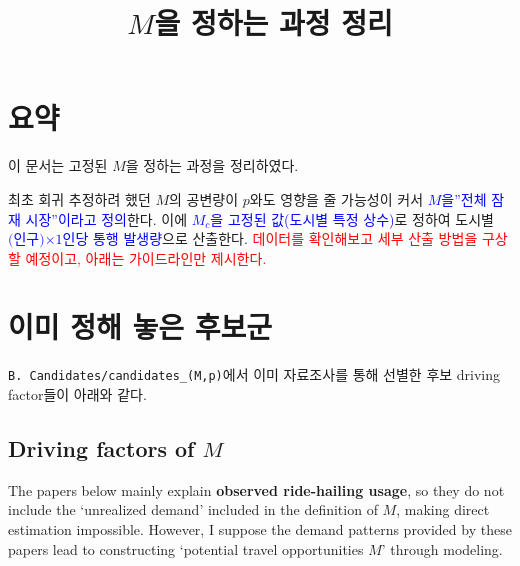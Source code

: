 \documentclass[10pt,a4paper]{article}
\title{\textbf{$M$을 정하는 과정 정리}}
\date{}
\newcommand{\red}[1]{\textcolor{red}{#1}}
\begin{document}
\maketitle
\vspace{-10mm}

\section{요약}
이 문서는 고정된 $M$을 정하는 과정을 정리하였다.

최초 회귀 추정하려 했던 $M$의 공변량이 $p$와도 영향을 줄 가능성이 커서 \textcolor{blue}{$M$을''전체 잠재 시장''이라고 정의}한다. 이에 \textcolor{blue}{$M_c$을 고정된 값(도시별 특정 상수)}로 정하여 도시별 \textcolor{blue}{$\textit{(인구)} $×$ \textit{1인당 통행 발생량}$}으로 산출한다. \red{데이터를 확인해보고 세부 산출 방법을 구상할 예정이고, 아래는 가이드라인만 제시한다.}



\section{이미 정해 놓은 후보군}

\texttt{B. Candidates/candidates\_(M,p)}에서 이미 자료조사를 통해 선별한 후보 driving factor들이 아래와 같다.

\subsection{Driving factors of $M$}
The papers below mainly explain \textbf{observed ride-hailing usage}, so they do not include the `unrealized demand' included in the definition of $M$, making direct estimation impossible. However, I suppose the demand patterns provided by these papers lead to constructing `potential travel opportunities $M$' through modeling.
\end{document}
